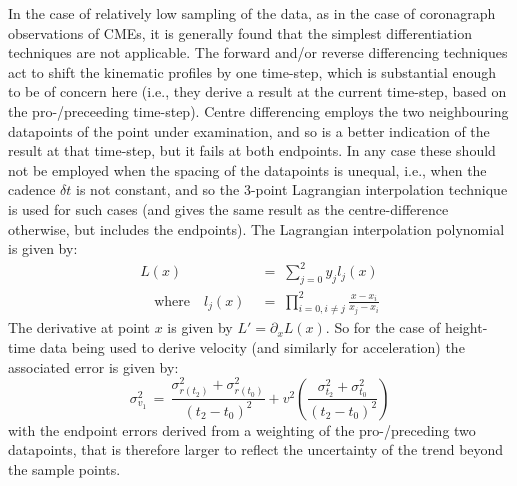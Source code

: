\documentclass[structabstract]{aa}
\begin{document}
In the case of relatively low sampling of the data, as in the case of coronagraph observations of CMEs, it is generally found that the simplest differentiation techniques are not applicable. The forward and/or reverse differencing techniques act to shift the kinematic profiles by one time-step, which is substantial enough to be of concern here (i.e., they derive a result at the current time-step, based on the pro-/preceeding time-step). Centre differencing employs the two neighbouring datapoints of the point under examination, and so is a better indication of the result at that time-step, but it fails at both endpoints. In any case these should not be employed when the spacing of the datapoints is unequal, i.e., when the cadence $\delta t$ is not constant, and so the 3-point Lagrangian interpolation technique is used for such cases (and gives the same result as the centre-difference otherwise, but includes the endpoints). The Lagrangian interpolation polynomial is given by:
\begin{eqnarray}
L(x) \; &=\; \sum_{j=0}^2 y_j l_j(x) \\ \quad \mbox{where} \quad
l_j(x) \; &=\; \prod_{i=0, i\neq j}^2 \frac{x-x_i}{x_j-x_i} 
\end{eqnarray}
The derivative at point $x$ is given by $L'=\partial_x L(x)$. So for the case of height-time data being used to derive velocity (and similarly for acceleration) the associated error is given by:
\begin{equation}
\sigma_{v_1}^2 \,=\, \frac{\sigma_{r(t_2)}^2+\sigma_{r(t_0)}^2}{(t_2-t_0)^2} + v^2 \left( \frac{\sigma_{t_2}^2+\sigma_{t_0}^2}{(t_2-t_0)^2} \right)
\label{vel_err}
\end{equation}
with the endpoint errors derived from a weighting of the pro-/preceding two datapoints, that is therefore larger to reflect the uncertainty of the trend beyond the sample points.
\end{document}
